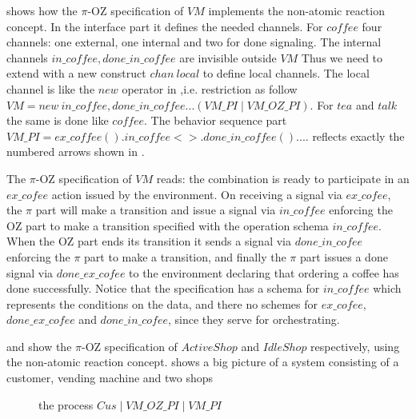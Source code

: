  shows how the $\pi$-OZ specification of $VM$ implements the non-atomic reaction concept. In the interface part it defines the needed channels. For $coffee$ four channels: one external, one internal and two for done signaling. The internal channels $in\_coffee,done\_in\_coffee$ are invisible outside $VM$ Thus we need to extend \oz{} with a new construct $chan\ local$ to define local channels. The local channel is like the $new$ operator in \picalc{},i.e. restriction as follow $VM = new\ in\_coffee,done\_in\_coffee...(VM\_PI\mid VM\_OZ\_PI)$. For $tea$ and $talk$ the same is done like $coffee$. The behavior sequence part $VM\_PI = ex\_coffee().in\_coffee<>.done\_in\_coffee() .... $ reflects exactly the numbered arrows shown in . 

The $\pi$-OZ specification of $VM$ reads: the combination is ready to participate in an $ex\_cofee$ action issued by the environment. On receiving a signal via $ex\_cofee$, the $\pi$ part will make a transition and issue a signal via $in\_coffee$ enforcing the OZ part to make a transition specified with the operation schema $in\_coffee$. When the OZ part ends its transition it sends a signal via $done\_in\_cofee$ enforcing the $\pi$ part to make a transition, and finally the $\pi$ part issues a done signal via $done\_ex\_cofee$ to the environment declaring that ordering a coffee has done successfully. Notice that the specification has a schema for $in\_coffee$ which represents the conditions on the data, and there no schemes for $ex\_cofee$, $done\_ex\_cofee$ and $done\_in\_cofee$, since they serve for orchestrating.

 and  show the $\pi$-OZ specification of $ActiveShop$ and $IdleShop$ respectively, using the non-atomic reaction concept.  shows a big picture of a system consisting of a customer, vending machine and two shops

\begin{figure}[H]%
\centering
{}%
\caption{the process $Cus \mid VM\_OZ\_PI \mid VM\_PI$}
\label{binary_reactoin}%
\end{figure}

